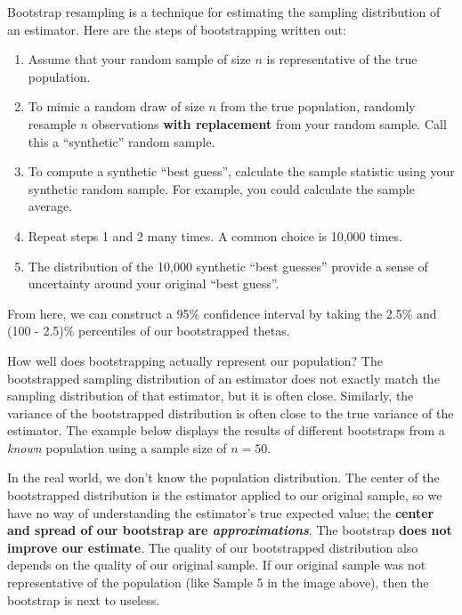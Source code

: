 \documentclass[
  letterpaper,
  DIV=11,
  numbers=noendperiod]{scrreprt}
\providecommand{\tightlist}{%
  \setlength{\itemsep}{0pt}\setlength{\parskip}{0pt}}\usepackage{longtable,booktabs,array}
\begin{document}
Bootstrap resampling is a technique for estimating the sampling
distribution of an estimator. Here are the steps of bootstrapping
written out:

\begin{enumerate}
\def\labelenumi{\arabic{enumi}.}
\setcounter{enumi}{-1}
\tightlist
\item
  Assume that your random sample of size \(n\) is representative of the
  true population.
\item
  To mimic a random draw of size \(n\) from the true population,
  randomly resample \(n\) observations \textbf{with replacement} from
  your random sample. Call this a ``synthetic'' random sample.
\item
  To compute a synthetic ``best guess'', calculate the sample statistic
  using your synthetic random sample. For example, you could calculate
  the sample average.
\item
  Repeat steps 1 and 2 many times. A common choice is 10,000 times.
\item
  The distribution of the 10,000 synthetic ``best guesses'' provide a
  sense of uncertainty around your original ``best guess''.
\end{enumerate}

From here, we can construct a 95\% confidence interval by taking the
2.5\% and (100 - 2.5)\% percentiles of our bootstrapped thetas.

How well does bootstrapping actually represent our population? The
bootstrapped sampling distribution of an estimator does not exactly
match the sampling distribution of that estimator, but it is often
close. Similarly, the variance of the bootstrapped distribution is often
close to the true variance of the estimator. The example below displays
the results of different bootstraps from a \emph{known} population using
a sample size of \(n=50\).

In the real world, we don't know the population distribution. The center
of the bootstrapped distribution is the estimator applied to our
original sample, so we have no way of understanding the estimator's true
expected value; the \textbf{center and spread of our bootstrap are
\emph{approximations}}. The bootstrap \textbf{does not improve our
estimate}. The quality of our bootstrapped distribution also depends on
the quality of our original sample. If our original sample was not
representative of the population (like Sample 5 in the image above),
then the bootstrap is next to useless.
\end{document}
